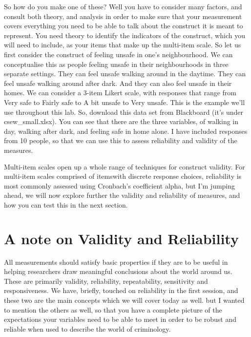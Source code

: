 \documentclass[]{book}
\theoremstyle{definition}
\theoremstyle{definition}
\theoremstyle{definition}
\theoremstyle{remark}
\begin{document}
So how do you make one of these? Well you have to consider many factors,
and consult both theory, and analysis in order to make sure that your
measurement covers everything you need to be able to talk about the
construct it is meant to represent. You need theory to identify the
indicators of the construct, which you will need to include, as your
items that make up the multi-item scale. So let us first consider the
construct of feeling unsafe in one's neighbourhood. We can conceptualise
this as people feeling unsafe in their neighbourhoods in three separate
settings. They can feel unsafe walking around in the daytime. They can
feel unsafe walking around after dark. And they can also feel unsafe in
their homes. We can consider a 3-item Likert scale, with responses that
range from Very safe to Fairly safe to A bit unsafe to Very unsafe. This
is the example we'll use throughout this lab. So, download this data set
from Blackboard (it's under csew\_small.xlsx). You can see that there
are the three variables, of walking in day, walking after dark, and
feeling safe in home alone. I have included responses from 10 people, so
that we can use this to assess reliability and validity of the measures.

Multi-item scales open up a whole range of techniques for construct
validity. For multi-item scales comprised of itemswith discrete response
choices, reliability is most commonly assessed using Cronbach's
coefficient alpha, but I'm jumping ahead, we will now explore further
the validity and reliability of measures, and how you can test this in
the next section.

\hypertarget{a-note-on-validity-and-reliability}{%
\section{A note on Validity and
Reliability}\label{a-note-on-validity-and-reliability}}

All measurements should satisfy basic properties if they are to be
useful in helping researchers draw meaningful conclusions about the
world around us. These are primarily validity, reliability,
repeatability, sensitivity and responsiveness. We have, briefly, touched
on reliability in the first session, and these two are the main concepts
which we will cover today as well. but I wanted to mention the others as
well, so that you have a complete picture of the expectations your
variables need to be able to meet in order to be robust and reliable
when used to describe the world of criminology.
\end{document}
